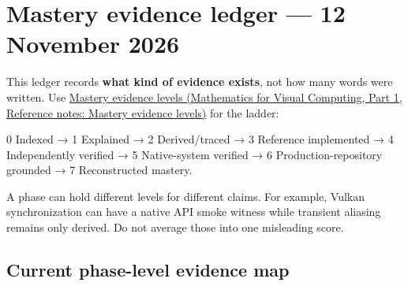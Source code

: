 \hypertarget{appendix-2358b21a702d}{}\label{referencestart:appendix-2358b21a702d}
\section{Mastery evidence ledger --- 12 November 2026}\label{appendix-2358b21a702d-mastery-evidence-ledger-12-november-2026}

\hypertarget{appendix-2358b21a702d-mastery-evidence-ledger-12-november-2026}{}

This ledger records \textbf{what kind of evidence exists}, not how many words were written. Use \href{../02-Mathematics-for-Visual-Computing-P01/main.pdf\#appendix-2a2e5bd7143a}{Mastery evidence levels (Mathematics for Visual Computing, Part 1, Reference notes: Mastery evidence levels)} for the ladder:

0 Indexed → 1 Explained → 2 Derived/traced → 3 Reference implemented → 4 Independently verified → 5 Native-system verified → 6 Production-repository grounded → 7 Reconstructed mastery.

A phase can hold different levels for different claims. For example, Vulkan synchronization can have a native API smoke witness while transient aliasing remains only derived. Do not average those into one misleading score.

\subsection{Current phase-level evidence map}\label{appendix-2358b21a702d-current-phase-level-evidence-map}

\hypertarget{appendix-2358b21a702d-current-phase-level-evidence-map}{}

